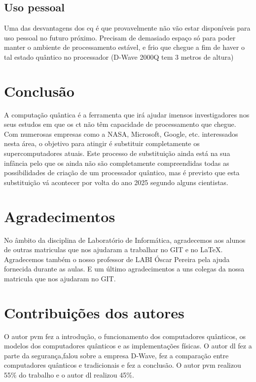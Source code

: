 \documentclass{report}
\begin{document}
\newpage

\section{Uso pessoal}
	Uma das desvantagens dos \ac{cq} é que provavelmente não vão estar disponíveis para uso pessoal no futuro próximo. Precisam de demasiado espaço só para poder manter o ambiente de processamento estável, e frio que chegue a fim de haver o tal estado quântico no processador (D-Wave 2000Q tem 3 metros de altura)

\clearpage
\null
\chapter{Conclusão}
\label{chap.conclusao}

	A computação quântica é a ferramenta que irá ajudar imensos investigadores nos seus estudos em que os \ac{ct} não têm capacidade de processamento que chegue. Com numerosas empresas como a NASA, Microsoft, Google, etc. interessados nesta área, o objetivo para atingir é substituir completamente os supercomputadores atuais. Este processo de substituição ainda está na sua infância pelo que os ainda não são completamente compreendidas todas as possibilidades de criação de um processador quântico, mas é previsto que esta substituição vá acontecer por volta do ano 2025 segundo alguns cientistas.



\clearpage
\null
\chapter{Agradecimentos}
\label{agradecimentos}
	No âmbito da disciplina de Laboratório de Informática, agradecemos aos alunos de outras matriculas que nos ajudaram a trabalhar no GIT e no \LaTeX . Agradecemos também o nosso professor de LABI Óscar Pereira pela ajuda fornecida durante as aulas. E um último agradecimentos a uns colegas da nossa matricula que nos ajudaram no GIT.

\clearpage
\null
\chapter{Contribuições dos autores}
\label{contribuição}
	O autor \ac{pvm} fez a introdução, o funcionamento dos computadores quânticos, os modelos dos computadores quânticos e as implementações físicas.
O autor \ac{dl} fez a parte da segurança,falou sobre a empresa D-Wave, fez a comparação entre computadores quânticos e tradicionais e fez a conclusão.
O autor \ac{pvm} realizou 55\% do trabalho e o autor \ac{dl} realizou 45\%.
\end{document}
